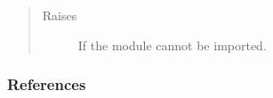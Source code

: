 \documentclass[letterpaper,10pt,english]{sphinxmanual}
\begin{document}
\begin{fulllineitems}
\begin{quote}
\begin{description}
\item[{Raises}] \leavevmode
{\hyperref[\detokenize{cockatoo:cockatoo.exception.SystemNotPresentError}]{}} \textendash{} If the  module cannot be imported.

\end{description}\end{quote}
\subsubsection*{References}

\end{fulllineitems}

\end{document}
